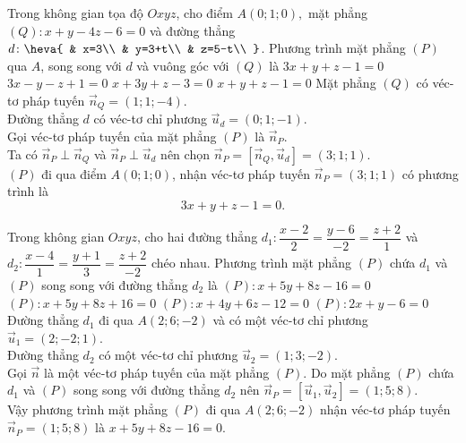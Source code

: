 \begin{ex}%
Trong không gian tọa độ $ Oxyz$, cho điểm $ A(0;1;0),$ mặt phẳng \break $(Q)\colon x+y-4z-6=0$ và đường thẳng $ d\colon\heva{
& x=3\\ 
& y=3+t\\ 
& z=5-t\\ 
}$. Phương trình mặt phẳng $(P)$ qua $ A$, song song với $ d$ và vuông góc với $(Q)$ là 
\choice
{\True $ 3x+y+z-1=0$}
{$ 3x-y-z+1=0$}
{$ x+3y+z-3=0$}
{$ x+y+z-1=0$}
\loigiai
{
Mặt phẳng $(Q)$ có véc-tơ pháp tuyến $\overrightarrow{n}_Q=(1;1;-4)$.\\
Đường thẳng $ d$ có véc-tơ chỉ phương $\overrightarrow{u}_d=(0;1;-1)$.\\
Gọi véc-tơ pháp tuyến của mặt phẳng $(P)$ là $\overrightarrow{n}_P$.\\
Ta có $\overrightarrow{n}_P\perp\overrightarrow{n}_Q$ và $\overrightarrow{n}_P\perp\overrightarrow{u}_d$ nên chọn $\overrightarrow{n}_P=\left[\overrightarrow{n}_Q,\overrightarrow{u}_d\right]=(3;1;1)$.\\
$(P)$ đi qua điểm $ A(0;1;0)$, nhận véc-tơ pháp tuyến $\overrightarrow{n}_P=(3;1;1)$ có phương trình là $$ 3x+y+z-1=0.$$}
\end{ex}

\begin{ex}%
Trong không gian $Oxyz$, cho hai đường thẳng $d_1\colon\dfrac{x-2}{2}=\dfrac{y-6}{-2}=\dfrac{z+2}{1}$ và $d_2\colon\dfrac{x-4}{1}=\dfrac{y+1}{3}=\dfrac{z+2}{-2}$ chéo nhau. Phương trình mặt phẳng $(P)$ chứa $d_1$ và $(P)$ song song với đường thẳng $d_2$ là
\choice
{\True $(P)\colon x+5y+8z-16=0$}
{$(P)\colon x+5y+8z+16=0$}
{$(P)\colon x+4y+6z-12=0$}
{$(P)\colon 2x+y-6=0$}
\loigiai
{
Đường thẳng $d_1$ đi qua $ A\left(2;6;-2\right)$ và có một véc-tơ chỉ phương $\overrightarrow{u}_1=\left(2;-2;1\right)$.\\
Đường thẳng $d_2$ có một véc-tơ chỉ phương $\overrightarrow{u}_2=(1;3;-2)$.\\
Gọi $\overrightarrow{n}$ là một véc-tơ pháp tuyến của mặt phẳng $(P)$. Do mặt phẳng $(P)$ chứa $d_1$ và $(P)$ song song với đường thẳng $d_2$ nên $\overrightarrow{n}_P=\left[\overrightarrow{u}_1,\overrightarrow{u}_2\right]=(1;5;8)$.\\
Vậy phương trình mặt phẳng $(P)$ đi qua $ A(2;6;-2)$ nhận véc-tơ pháp tuyến $\overrightarrow{n}_P=(1;5;8)$ là $ x+5y+8z-16=0$.}
\end{ex}

